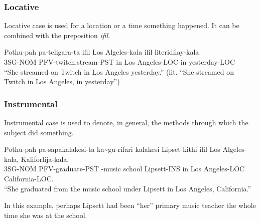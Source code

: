 \subsubsection{Locative}
Locative case is used for a location or a time something happened. It can be combined with the preposition \textit{ifil}.

\begin{exe}
\ex{} \gll{}Pothu-pah pa-teligara-ta        ifil Los Algeles-kala ifil literidilay-kala\\
            3SG-NOM   PFV-twitch.stream-PST in   Los Angeles-LOC  in   yesterday-LOC\\
    \glt{}``She streamed on Twitch in Los Angeles yesterday.'' (lit. ``She streamed on Twitch in Los Angeles, in yesterday'')
\end{exe}

\subsubsection{Instrumental}
Instrumental case is used to denote, in general, the methods through which the subject did something.

\begin{exe}
\ex{} \gll{}Pothu-pah pa-sapakalakesi-ta ka\~{}gu-rifari  kalakesi Lipset-kithi ifil Los Algeles-kala, Kaliforlija-kala.\\
            3SG-NOM   PFV-graduate-PST   \agradj{}-music  school   Lipsett-INS  in   Los Angeles-LOC   California-LOC.\\
    \glt{}``She graduated from the music school under Lipsett in Los Angeles, California.''
\end{exe}
In this example, perhaps Lipsett had been ``her'' primary music teacher the whole time she was at the school.

\newpage{}
